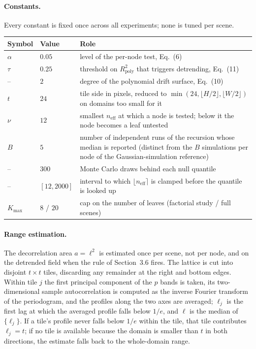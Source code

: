 \documentclass[11pt]{article}
\newcommand{\neff}{n_{\mathrm{eff}}}
\begin{document}
\paragraph{Constants.}
Every constant is fixed once across all experiments; none is tuned per scene.

\begin{center}
\small
\begin{tabular}{llp{6.4cm}}
\toprule
Symbol & Value & Role\\
\midrule
$\alpha$ & $0.05$ & level of the per-node test, Eq.~(6)\\
$\tau$   & $0.25$ & threshold on $R^{2}_{\mathrm{poly}}$ that triggers
                    detrending, Eq.~(11)\\
--       & $2$    & degree of the polynomial drift surface, Eq.~(10)\\
$t$      & $24$   & tile side in pixels, reduced to
                    $\min(24,\lfloor H/2\rfloor,\lfloor W/2\rfloor)$ on domains
                    too small for it\\
$\nu$    & $12$   & smallest $\neff$ at which a node is tested; below it the
                    node becomes a leaf untested\\
$B$      & $5$    & number of independent runs of the recursion whose median
                    is reported (distinct from the $B$ simulations per node of
                    the Gaussian-simulation reference)\\
--       & $300$  & Monte Carlo draws behind each null quantile\\
--       & $[12,2000]$ & interval to which $\lfloor\neff\rceil$ is clamped
                    before the quantile is looked up\\
$K_{\max}$ & $8$ / $20$ & cap on the number of leaves (factorial study / full
                    scenes)\\
\bottomrule
\end{tabular}
\end{center}

\paragraph{Range estimation.}
The decorrelation area $a=\ell^{2}$ is estimated once per scene, not per node,
and on the detrended field when the rule of Section~3.6 fires. The lattice is
cut into disjoint $t\times t$ tiles, discarding any remainder at the right and
bottom edges. Within tile $j$ the first principal component of the $p$ bands is
taken, its two-dimensional sample autocorrelation is computed as the inverse
Fourier transform of the periodogram, and the profiles along the two axes are
averaged; $\ell_j$ is the first lag at which the averaged profile falls below
$1/e$, and $\ell$ is the median of $\{\ell_j\}$. If a tile's profile never
falls below $1/e$ within the tile, that tile contributes $\ell_j=t$; if no
tile is available because the domain is smaller than $t$ in both directions,
the estimate falls back to the whole-domain range.
\end{document}
